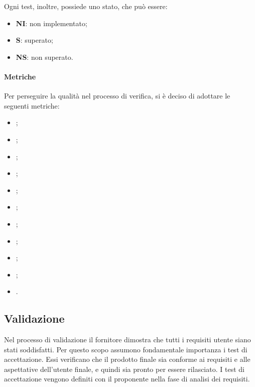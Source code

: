 Ogni test, inoltre, possiede uno stato, che può essere:
\begin{itemize}
      \item \textbf{NI}: non implementato;
      \item \textbf{S}: superato;
      \item \textbf{NS}: non superato.
\end{itemize}
\paragraph{Metriche}
Per perseguire la qualità nel processo di verifica, si è deciso di adottare le
seguenti metriche:
\begin{itemize}
      \item {};
      \item {};
      \item {};
      \item {};
      \item {};
      \item {};
      \item {};
      \item {};
      \item {};
      \item {};
      \item {}.
\end{itemize}
\subsection{Validazione}
Nel processo di validazione il fornitore dimostra che tutti i requisiti utente
siano stati soddisfatti. Per questo scopo assumono fondamentale importanza
i test di accettazione. Essi verificano che il prodotto finale sia conforme ai requisiti e
alle aspettative dell'utente finale, e quindi sia pronto per essere rilasciato.
I test di accettazione vengono definiti con il proponente nella fase di analisi dei requisiti.
